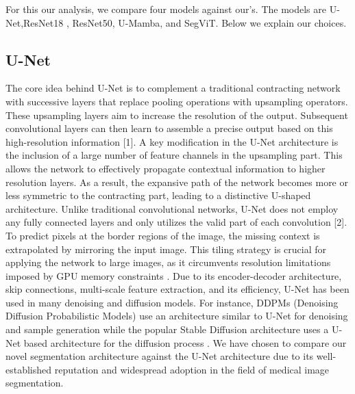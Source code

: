 \documentclass[conference]{IEEEtran}
\begin{document}
For this our analysis, we compare four models against our's. The models are U-Net\cite{ronneberger2015unet},ResNet18 \cite{DBLP:journals/corr/HeZRS15}, ResNet50, U-Mamba\cite{U-Mamba}, and SegViT\cite{dosovitskiy2021image}. Below we explain our choices.
\subsection{U-Net}
 The core idea behind U-Net is to complement a traditional contracting network with successive layers that replace pooling operations with upsampling operators. These upsampling layers aim to increase the resolution of the output. Subsequent convolutional layers can then learn to assemble a precise output based on this high-resolution information [1]. 
 A key modification in the U-Net architecture is the inclusion of a large number of feature channels in the upsampling part. This allows the network to effectively propagate contextual information to higher resolution layers. As a result, the expansive path of the network becomes more or less symmetric to the contracting part, leading to a distinctive U-shaped architecture. Unlike traditional convolutional networks, U-Net does not employ any fully connected layers and only utilizes the valid part of each convolution [2]. To predict pixels at the border regions of the image, the missing context is extrapolated by mirroring the input image. This tiling strategy is crucial for applying the network to large images, as it circumvents resolution limitations imposed by GPU memory constraints \cite{ronneberger2015unet}. Due to its encoder-decoder architecture, skip connections, multi-scale feature extraction, and its efficiency, U-Net has been used in many denoising and diffusion models. For instance, DDPMs (Denoising Diffusion Probabilistic Models) use an architecture similar to U-Net for denoising and sample generation \cite{DBLP:journals/corr/abs-2006-11239} while the popular Stable Diffusion architecture uses a U-Net based architecture for the diffusion process \cite{rombach2021highresolution}. We have chosen to compare our novel segmentation architecture against the U-Net architecture due to its well-established reputation and widespread adoption in the field of medical image segmentation.
 
\end{document}
